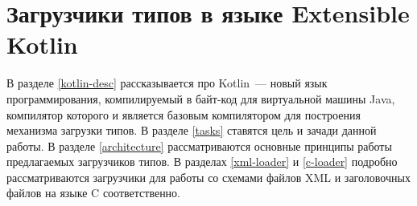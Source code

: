 \section{Загрузчики типов в языке Extensible Kotlin}
В разделе \ref{kotlin-desc} рассказывается про Kotlin~--- новый язык программирования, компилируемый в байт-код для виртуальной машины Java, компилятор которого и является базовым компилятором для построения механизма загрузки типов.
В разделе \ref{tasks} ставятся цель и зачади данной работы.
В разделе \ref{architecture} рассматриваются основные принципы работы предлагаемых загрузчиков типов.
В разделах \ref{xml-loader} и \ref{c-loader} подробно рассматриваются загрузчики для работы со схемами файлов XML и заголовочных файлов на языке C соответственно.





